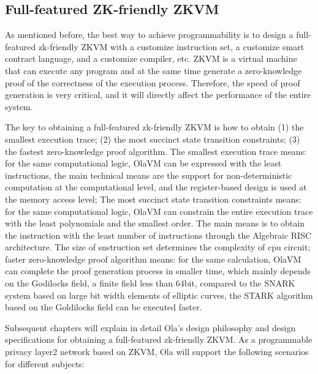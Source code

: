 \subsection{Full-featured ZK-friendly ZKVM}

As mentioned before, the best way to achieve programmability is to design a full-featured zk-friendly ZKVM with a customize instruction set, a customize smart contract language, and a customize compiler, etc. 
ZKVM is a virtual machine that can execute any program and at the same time generate a zero-knowledge proof of the correctness of the execution process. Therefore, the speed of proof generation 
is very critical, and it will directly affect the performance of the entire system.

The key to obtaining a full-featured zk-friendly ZKVM is how to obtain (1) the smallest execution trace; (2) the most succinct state transition constraints; (3) the fastest 
zero-knowledge proof algorithm. The smallest execution trace means: for the same computational logic, OlaVM \cite{website:OlaVM} can be expressed with the least instructions, the main technical means are the 
support for non-deterministic computation at the computational level, and the register-based design is used at the memory access level; The most succinct state transition constraints means: 
for the same computational logic, OlaVM \cite{website:OlaVM} can constrain the entire execution trace with the least polynomials and the smallest order. The main means is to obtain the instruction with the least 
number of instructions through the Algebraic RISC architecture. The size of snstruction set determines the complexity of cpu circuit; faster zero-knowledge proof algorithm 
means: for the same calculation, OlaVM \cite{website:OlaVM} can complete the proof generation process in smaller time, which mainly depends on the Godilocks \cite{website:Goldilocks} field, a finite field less than 64bit, compared to the 
SNARK system based on large bit width elements of elliptic curves, the STARK algorithm based on the Goldilocks \cite{website:Goldilocks} field can be executed faster.

Subsequent chapters will explain in detail Ola's design philosophy and design specifications for obtaining a full-featured zk-friendly ZKVM. As a programmable privacy layer2 network 
based on ZKVM, Ola will support the following scenarios for different subjects:

